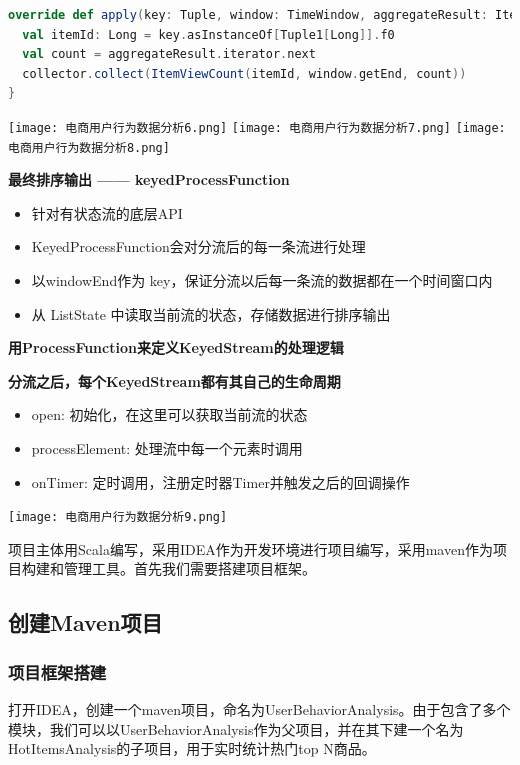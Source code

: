 \documentclass[oneside]{ctexbook}
\begin{document}
\begin{lstlisting}[language=scala]
override def apply(key: Tuple, window: TimeWindow, aggregateResult: Iterable[Long], collector: Collector[ItemViewCount]) : Unit = {
  val itemId: Long = key.asInstanceOf[Tuple1[Long]].f0
  val count = aggregateResult.iterator.next
  collector.collect(ItemViewCount(itemId, window.getEnd, count))
}
\end{lstlisting}

\noindent \texttt{[image: 电商用户行为数据分析6.png]}
\noindent \texttt{[image: 电商用户行为数据分析7.png]}
\noindent \texttt{[image: 电商用户行为数据分析8.png]}

\textbf{最终排序输出 —— keyedProcessFunction}
\begin{itemize}
\item 针对有状态流的底层API
\item KeyedProcessFunction会对分流后的每一条流进行处理
\item 以windowEnd作为 key，保证分流以后每一条流的数据都在一个时间窗口内
\item 从 ListState 中读取当前流的状态，存储数据进行排序输出
\end{itemize}

\textbf{用ProcessFunction来定义KeyedStream的处理逻辑}

\textbf{分流之后，每个KeyedStream都有其自己的生命周期}
\begin{itemize}
\item open: 初始化，在这里可以获取当前流的状态
\item processElement: 处理流中每一个元素时调用
\item onTimer: 定时调用，注册定时器Timer并触发之后的回调操作
\end{itemize}

\noindent \texttt{[image: 电商用户行为数据分析9.png]}

项目主体用Scala编写，采用IDEA作为开发环境进行项目编写，采用maven作为项目构建和管理工具。首先我们需要搭建项目框架。

\subsection{创建Maven项目}

\subsubsection{项目框架搭建}

打开IDEA，创建一个maven项目，命名为UserBehaviorAnalysis。由于包含了多个模块，我们可以以UserBehaviorAnalysis作为父项目，并在其下建一个名为HotItemsAnalysis的子项目，用于实时统计热门top N商品。
\end{document}
